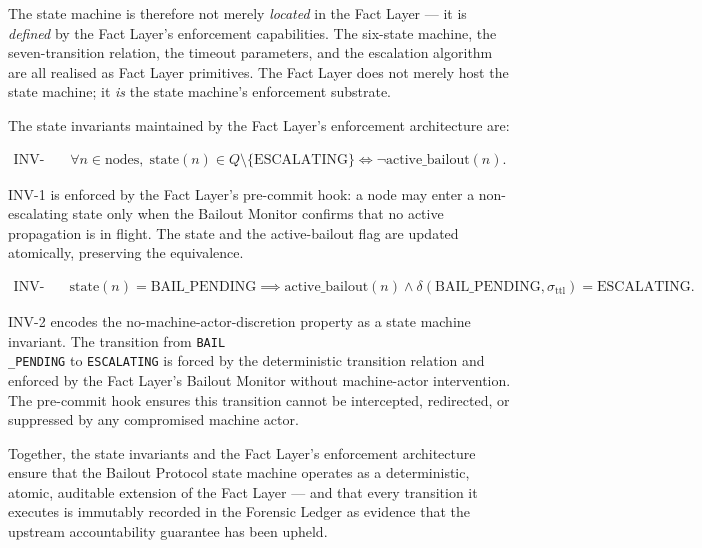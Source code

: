 The state machine is therefore not merely \emph{located} in the Fact Layer — it is \emph{defined} by the Fact Layer's enforcement capabilities. The six-state machine, the seven-transition relation, the timeout parameters, and the escalation algorithm are all realised as Fact Layer primitives. The Fact Layer does not merely host the state machine; it \emph{is} the state machine's enforcement substrate.

The state invariants maintained by the Fact Layer's enforcement architecture are:

\begin{align}
\text{INV-1:}&\quad \forall n \in \text{nodes},\; \text{state}(n) \in Q \setminus \{\text{ESCALATING}\} \iff \neg\text{active\_bailout}(n) . \tag{BP-INV-1}
\end{align}

INV-1 is enforced by the Fact Layer's pre-commit hook: a node may enter a non-escalating state only when the Bailout Monitor confirms that no active propagation is in flight. The state and the active-bailout flag are updated atomically, preserving the equivalence.

\begin{align}
\text{INV-2:}&\quad \text{state}(n) = \text{BAIL\_PENDING} \implies \text{active\_bailout}(n) \land \delta(\text{BAIL\_PENDING}, \sigma_{\text{ttl}}) = \text{ESCALATING} . \tag{BP-INV-2}
\end{align}

INV-2 encodes the no-machine-actor-discretion property as a state machine invariant. The transition from \texttt{BAIL\\_PENDING} to \texttt{ESCALATING} is forced by the deterministic transition relation and enforced by the Fact Layer's Bailout Monitor without machine-actor intervention. The pre-commit hook ensures this transition cannot be intercepted, redirected, or suppressed by any compromised machine actor.

Together, the state invariants and the Fact Layer's enforcement architecture ensure that the Bailout Protocol state machine operates as a deterministic, atomic, auditable extension of the Fact Layer — and that every transition it executes is immutably recorded in the Forensic Ledger as evidence that the upstream accountability guarantee has been upheld.


